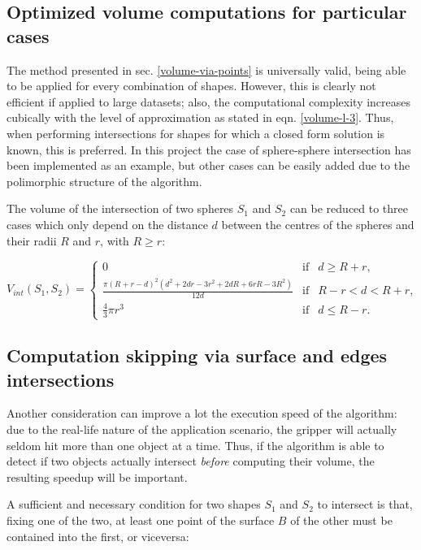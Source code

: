 \subsection{Optimized volume computations for particular cases}
The method presented in sec. \ref{volume-via-points} is universally valid,
being able to be applied for every combination of shapes. However, this is
clearly not efficient if applied to large datasets; also, the computational
complexity increases cubically with the level of approximation as stated in
eqn. \ref{volume-l-3}. Thus, when performing intersections for shapes for which
a closed form solution is known, this is preferred. In this project the case of
sphere-sphere intersection has been implemented as an example, but other cases
can be easily added due to the polimorphic structure of the algorithm.

The volume of the intersection of two spheres $S_1$ and $S_2$ can be reduced to three cases which only
depend on the distance $d$ between the centres of the spheres and their radii
$R$ and $r$, with $R\geq r$:

\begin{equation}
  V_{int}\left(S_1,S_2\right)=\left\{\begin{array}{lcr}
      0 & \mbox{if} & d\geq R+r, \\
      \frac{\pi \left(R+r-d\right) ^2 \left(
      d^2 + 2dr - 3r^2 + 2dR + 6rR-3R ^2 \right) }{12d}
      & \mbox{if} & R-r<d<R+r, \\
      \frac{4}{3}\pi r^3 & \mbox{if} & d \leq R-r.
  \end{array}\right.
\end{equation}

\subsection{Computation skipping via surface and edges intersections}
Another consideration can improve a lot the execution speed of the algorithm:
due to the real-life nature of the application scenario, the gripper will
actually seldom hit more than one object at a time. Thus, if the algorithm is
able to detect if two objects actually intersect \emph{before} computing their
volume, the resulting speedup will be important.

A sufficient and necessary condition for two shapes $S_1$ and $S_2$ to intersect is that, fixing
one of the two, at least one point of the surface $B$ of the other must be contained
into the first, or viceversa:

